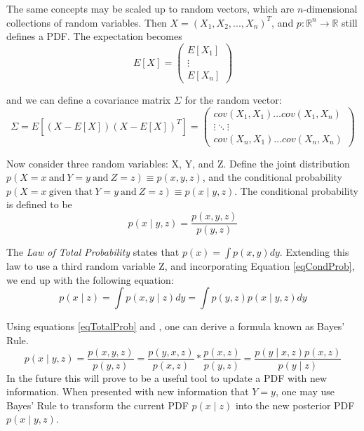 The same concepts may be scaled up to random vectors, which are \(n\)-dimensional collections of random variables. Then \(X = (X_1,X_2,...,X_n)^T\), and \(p:\mathbb{R}^n \to \mathbb{R}\) still defines a PDF. The expectation becomes \[
E[X] = \begin{pmatrix}
E[X_1] \\
\vdots \\
E[X_n]
\end{pmatrix} 
\]

and we can define a covariance matrix \(\Sigma\) for the random vector:
\[
\Sigma = E[(X - E[X])(X - E[X])^T] = \begin{pmatrix}
cov(X_1,X_1)  \dots cov(X_1,X_n) \\
\vdots \ddots \vdots \\
cov(X_n,X_1)  \dots cov(X_n,X_n)
\end{pmatrix} 
\]


Now consider three random variables: X, Y, and Z. Define the joint distribution \(p(X=x\ \textrm{and}\ Y=y\ \textrm{and}\ Z=z) \equiv p(x,y,z)\), and the conditional probability \(p(X=x\ \textrm{given that}\ Y=y\ \textrm{and}\ Z=z) \equiv p(x \mathbin{\vert} y,z)\). The conditional probability is defined to be
\begin{equation} \label{eqCondProb}
p(x \mathbin{\vert} y,z) = \frac{p(x,y,z)}{p(y,z)}
\end{equation}

The \textit{Law of Total Probability} states that \(p(x) = \int p(x,y)dy\). Extending this law to use a third random variable Z, and incorporating Equation \ref{eqCondProb}, we end up with the following equation:
\begin{equation} \label{eqTotalProb}
p(x \mathbin{\vert} z) = \int p(x,y \mathbin{\vert} z)dy
= \int p(y,z)p(x \mathbin{\vert} y,z)dy
\end{equation}

Using equations \ref{eqTotalProb} and , one can derive a formula known as Bayes' Rule. 
\begin{equation} \label{eqBayesThm}
p(x \mathbin{\vert} y,z) = \frac{p(x,y,z)}{p(y,z)} = \frac{p(y,x,z)}{p(x,z)} * \frac{p(x,z)}{p(y,z)} = \frac{p(y \mathbin{\vert} x,z)p(x,z)}{p(y \mathbin{\vert} z)}
\end{equation}
In the future this will prove to be a useful tool to update a PDF with new information. When presented with new information that  \(Y = y\), one may use Bayes' Rule to transform the current PDF \(p(x \mathbin{\vert}z)\) into the new posterior PDF \(p(x \mathbin{\vert} y,z)\). %

